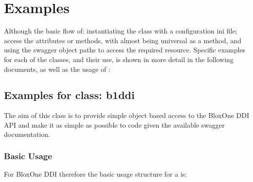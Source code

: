 \documentclass[letterpaper,10pt,english]{sphinxmanual}
\begin{document}
\begin{sphinxVerbatim}[commandchars=\\\{\}]
 
   
  
  

    
   
\end{sphinxVerbatim}


\section{Examples}
\label{\detokenize{usage:examples}}
\sphinxAtStartPar
Although the basic flow of: instantiating the class with a configuration ini
file; access the attributes or methods, with  almost being universal
as a method, and using the swagger object paths to access the required
resource. Specific examples for each of the classes, and their use, is shown
in more detail in the following documents, as well as the usage of :


\subsection{Examples for class: b1ddi}
\label{\detokenize{b1ddi-usage:examples-for-class-b1ddi}}\label{\detokenize{b1ddi-usage::doc}}
\sphinxAtStartPar
The aim of this class is to provide simple object based access to the
BloxOne DDI API and make it as simple as possible to code given the available
swagger documentation.


\subsubsection{Basic Usage}
\label{\detokenize{b1ddi-usage:basic-usage}}
\sphinxAtStartPar
For BloxOne DDI therefore the basic usage structure for a  is:
\end{document}
